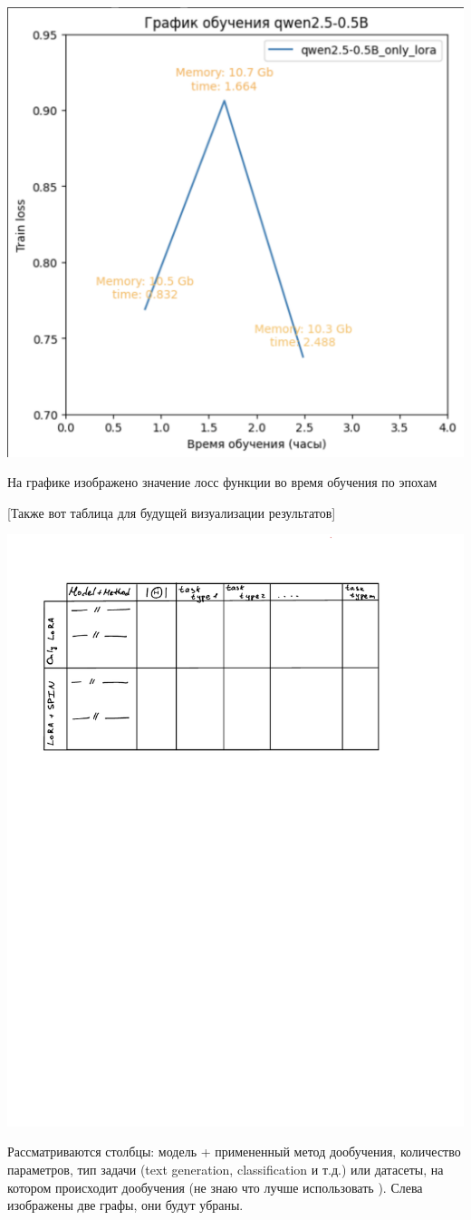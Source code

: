 \documentclass[12pt, twoside]{article}
\begin{document}
\includegraphics[scale=0.5]{images/qwen_training.pdf}

На графике изображено значение лосс функции во время обучения по эпохам

[Также вот таблица для будущей визуализации результатов]

\includegraphics{images/table_draft.pdf}

Рассматриваются столбцы: модель + примененный метод дообучения, количество параметров, тип задачи (text generation, classification и т.д.) или датасеты, на котором происходит дообучения (не знаю что лучше использовать ). Слева изображены две графы, они будут убраны.

\printbibliography
\end{document}
